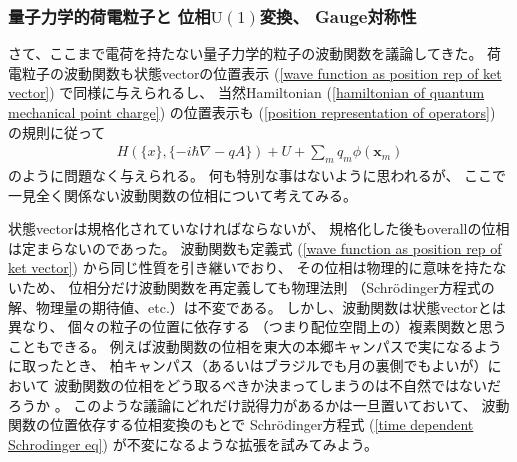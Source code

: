 \subsubsection{量子力学的荷電粒子と
    位相$\mathrm{U}(1)$変換、
    Gauge対称性}

さて、ここまで電荷を持たない量子力学的粒子の波動関数を議論してきた。
荷電粒子の波動関数も状態vectorの位置表示
(\ref{wave function as position rep of ket vector})
で同様に与えられるし、
当然Hamiltonian
(\ref{hamiltonian of quantum mechanical point charge})
の位置表示も
(\ref{position representation of operators})
の規則に従って
\begin{align}
    H (\{x\},
    \{- i \hbar \nabla - q A\})
  + U
  + \sum_m q_m \phi(\bm{x}_m)
\label{position rep of charged many particle hamiltonian}
\end{align}
のように問題なく与えられる。
何も特別な事はないように思われるが、
ここで一見全く関係ない波動関数の位相について考えてみる。

状態vectorは規格化されていなければならないが、
規格化した後もoverallの位相は定まらないのであった。
波動関数も定義式
(\ref{wave function as position rep of ket vector})
から同じ性質を引き継いでおり、
その位相は物理的に意味を持たないため、
位相分だけ波動関数を再定義しても物理法則
（Schr\"odinger方程式の解、物理量の期待値、etc.）は不変である。
しかし、波動関数は状態vectorとは異なり、
個々の粒子の位置に依存する
（つまり配位空間上の）複素関数と思うこともできる。
例えば波動関数の位相を東大の本郷キャンパスで実になるように取ったとき、
柏キャンパス（あるいはブラジルでも月の裏側でもよいが）において
波動関数の位相をどう取るべきか決まってしまうのは不自然ではないだろうか
\cite{fujikawa gauge review}。
このような議論にどれだけ説得力があるかは一旦置いておいて、
波動関数の位置依存する位相変換のもとで
Schr\"odinger方程式
(\ref{time dependent Schrodinger eq})
が不変になるような拡張を試みてみよう。

